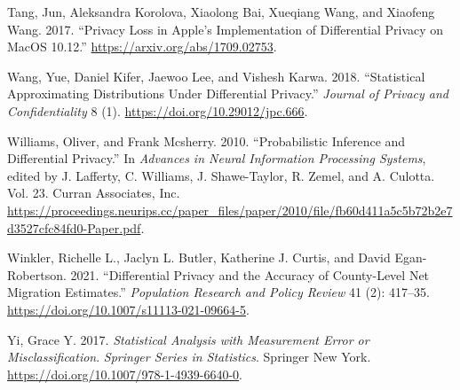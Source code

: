 \begin{CSLReferences}{1}{0}
\leavevmode{}%
Tang, Jun, Aleksandra Korolova, Xiaolong Bai, Xueqiang Wang, and Xiaofeng Wang. 2017. {``Privacy Loss in Apple's Implementation of Differential Privacy on MacOS 10.12.''} \url{https://arxiv.org/abs/1709.02753}.

\leavevmode{}%
Wang, Yue, Daniel Kifer, Jaewoo Lee, and Vishesh Karwa. 2018. {``Statistical Approximating Distributions Under Differential Privacy.''} \emph{Journal of Privacy and Confidentiality} 8 (1). \url{https://doi.org/10.29012/jpc.666}.

\leavevmode{}%
Williams, Oliver, and Frank Mcsherry. 2010. {``Probabilistic Inference and Differential Privacy.''} In \emph{Advances in Neural Information Processing Systems}, edited by J. Lafferty, C. Williams, J. Shawe-Taylor, R. Zemel, and A. Culotta. Vol. 23. Curran Associates, Inc. \url{https://proceedings.neurips.cc/paper_files/paper/2010/file/fb60d411a5c5b72b2e7d3527cfc84fd0-Paper.pdf}.

\leavevmode{}%
Winkler, Richelle L., Jaclyn L. Butler, Katherine J. Curtis, and David Egan-Robertson. 2021. {``Differential Privacy and the Accuracy of County-Level Net Migration Estimates.''} \emph{Population Research and Policy Review} 41 (2): 417--35. \url{https://doi.org/10.1007/s11113-021-09664-5}.

\leavevmode{}%
Yi, Grace Y. 2017. \emph{Statistical Analysis with Measurement Error or Misclassification}. \emph{Springer Series in Statistics}. Springer New York. \url{https://doi.org/10.1007/978-1-4939-6640-0}.

\end{CSLReferences}



\address{%
Kevin Eng\\
Rutgers University\\%
Department of Statistics\\ Piscataway, NJ 08854\\
%
\url{https://www.britannica.com/animal/quokka}\\%
%
\href{mailto:ke157@stat.rutgers.edu}{\nolinkurl{ke157@stat.rutgers.edu}}%
}

\address{%
Jordan A. Awan\\
Purdue University\\%
Department of Statistics\\ West Lafayette, IN 47907\\
%
\url{https://www.britannica.com/animal/quokka}\\%
%
\href{mailto:jawan@purdue.edu}{\nolinkurl{jawan@purdue.edu}}%
}

